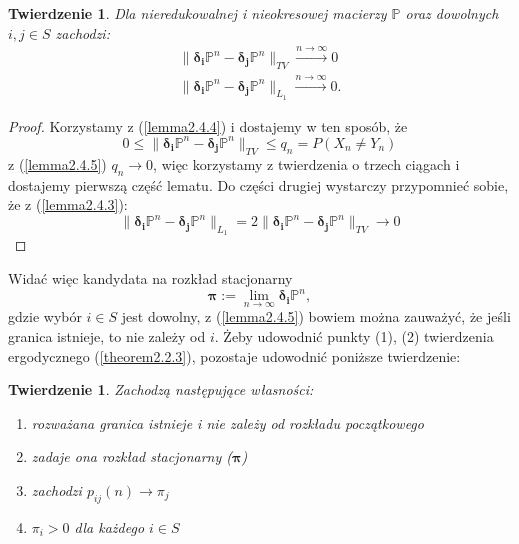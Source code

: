 \documentclass[a4paper]{article}
\theoremstyle{defn}
\theoremstyle{theorem}
\newtheorem{theorem}[defn]{Twierdzenie}
\theoremstyle{lemma}
\theoremstyle{cor}
\theoremstyle{fact}
\begin{document}
\begin{theorem}\label{theorem2.4.6}
Dla nieredukowalnej i nieokresowej macierzy $\mathbb{P}$ oraz dowolnych $i, j \in S$ zachodzi:
\begin{align*}
\|\boldsymbol{\delta_i}\mathbb{P}^n - \boldsymbol{\delta_j}\mathbb{P}^n\|_{TV} \xrightarrow{n \to \infty} 0 \\
\|\boldsymbol{\delta_i}\mathbb{P}^n - \boldsymbol{\delta_j}\mathbb{P}^n\|_{L_1} \xrightarrow{n \to \infty} 0.
\end{align*}
\end{theorem}
\begin{proof}
Korzystamy z (\ref{lemma2.4.4}) i dostajemy w ten sposób, że $$0 \leq \|\boldsymbol{\delta_i}\mathbb{P}^n - \boldsymbol{\delta_j}\mathbb{P}^n\|_{TV} \leq q_n = P(X_n \neq Y_n)$$
z (\ref{lemma2.4.5}) $q_n \to 0$, więc korzystamy z twierdzenia o trzech ciągach i dostajemy pierwszą część lematu. Do części drugiej wystarczy przypomnieć sobie, że z (\ref{lemma2.4.3}):  $$\|\boldsymbol{\delta_i}\mathbb{P}^n - \boldsymbol{\delta_j}\mathbb{P}^n\|_{L_1} = 2\|\boldsymbol{\delta_i}\mathbb{P}^n - \boldsymbol{\delta_j}\mathbb{P}^n\|_{TV} \to 0$$
\end{proof}
Widać więc kandydata na rozkład stacjonarny $$\boldsymbol{\pi} := \lim\limits_{n \to \infty} \boldsymbol{\delta_i}\mathbb{P}^n,$$ gdzie wybór $i \in S$ jest dowolny, z (\ref{lemma2.4.5}) bowiem można zauważyć, że jeśli granica istnieje, to nie zależy od $i$. Żeby udowodnić punkty (1), (2) twierdzenia ergodycznego (\ref{theorem2.2.3}), pozostaje udowodnić poniższe twierdzenie:
\begin{theorem}\label{theorem2.4.7}
Zachodzą następujące własności:
\begin{enumerate}
	\item[(a)] rozważana granica istnieje i nie zależy od rozkładu początkowego
	\item[(b)] zadaje ona rozkład stacjonarny ($\boldsymbol{\pi}$)
	\item[(c)] zachodzi $p_{ij}(n) \to \pi_j$
	\item[(d)] $\pi_i > 0$ dla każdego $i \in S$
\end{enumerate}
\end{theorem}
\end{document}
